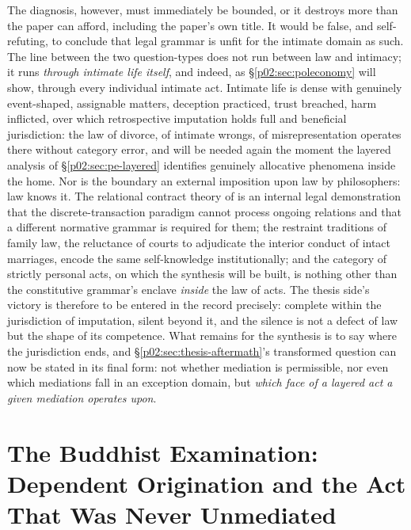 \documentclass[11pt,a4paper]{article}
\begin{document}
The diagnosis, however, must immediately be bounded, or it destroys more than the paper can afford, including the paper's own title. It would be false, and self-refuting, to conclude that legal grammar is unfit for the intimate domain as such. The line between the two question-types does not run between law and intimacy; it runs \emph{through intimate life itself}, and indeed, as \S\ref{p02:sec:poleconomy} will show, through every individual intimate act. Intimate life is dense with genuinely event-shaped, assignable matters, deception practiced, trust breached, harm inflicted, over which retrospective imputation holds full and beneficial jurisdiction: the law of divorce, of intimate wrongs, of misrepresentation operates there without category error, and will be needed again the moment the layered analysis of \S\ref{p02:sec:pe-layered} identifies genuinely allocative phenomena inside the home. Nor is the boundary an external imposition upon law by philosophers: law knows it. The relational contract theory of \textcite{macneil1980new} is an internal legal demonstration that the discrete-transaction paradigm cannot process ongoing relations and that a different normative grammar is required for them; the restraint traditions of family law, the reluctance of courts to adjudicate the interior conduct of intact marriages, encode the same self-knowledge institutionally; and the category of strictly personal acts, on which the synthesis will be built, is nothing other than the constitutive grammar's enclave \emph{inside} the law of acts. The thesis side's victory is therefore to be entered in the record precisely: complete within the jurisdiction of imputation, silent beyond it, and the silence is not a defect of law but the shape of its competence. What remains for the synthesis is to say where the jurisdiction ends, and \S\ref{p02:sec:thesis-aftermath}'s transformed question can now be stated in its final form: not whether mediation is permissible, nor even which mediations fall in an exception domain, but \emph{which face of a layered act a given mediation operates upon}.

\section{The Buddhist Examination: Dependent Origination and the Act That Was Never Unmediated}
\label{p02:sec:buddhism}
\end{document}
